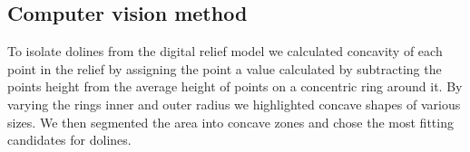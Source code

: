 \documentclass[a0,portrait]{a0poster}
\begin{document}
\begin{multicols}{2}


\section*{Computer vision method}

To isolate dolines from the digital relief model we calculated concavity of each point in the relief by assigning the point a value calculated by subtracting the points height from the average height of points on a concentric ring around it. By varying the rings inner and outer radius we highlighted concave shapes of various sizes.
We then segmented the area into concave zones and chose the most fitting candidates for dolines.


\end{multicols}
\end{document}
